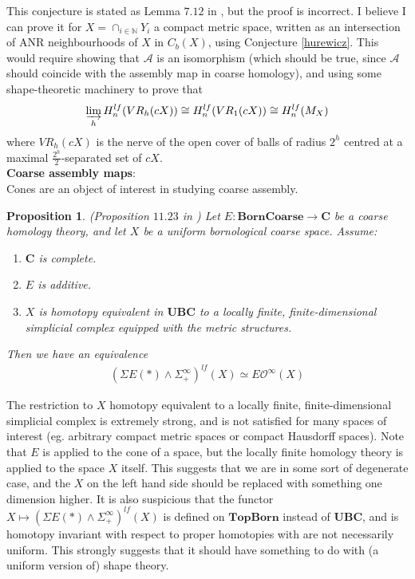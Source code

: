 \documentclass[a4paper,11pt]{article}
\theoremstyle{definition}
\theoremstyle{plain}
\newtheorem{prop}[definition]{Proposition}
\theoremstyle{remark}
\begin{document}
{This conjecture is stated as Lemma $7.12$ in \cite{bunke2020lecture}, but the proof is incorrect. I believe I can prove it for $X = \cap_{i\in \mathbb{N}} Y_{i}$ a compact metric space, written as an intersection of ANR neighbourhoods of $X$ in $C_{b}(X)$, using Conjecture \ref{hurewicz}. This would require showing that $\mathcal{A}$ is an isomorphism (which should be true, since $\mathcal{A}$ should coincide with the assembly map in coarse homology), and using some shape-theoretic machinery to prove that 
\begin{align*}
\varinjlim_{h} H^{lf}_{n}(VR_{h}(cX))\cong  H^{lf}_{n}(VR_{1}(cX)) \cong H^{lf}_{n}(M_{X})
\end{align*}
where $VR_{h}(cX)$ is the nerve of the open cover of balls of radius $2^{h}$ centred at a maximal $\frac{2^h}{2}$-separated set of $cX$. \\

 \textbf{Coarse assembly maps}:\\

Cones are an object of interest in studying coarse assembly. 
 
 \begin{prop}  \label{assemblymap} (Proposition $11.23$ in \cite{bunke2020coarse}) Let $E:\mathbf{BornCoarse}\rightarrow \mathbf{C}$ be a coarse homology theory, and let $X$ be a uniform bornological coarse space. Assume:
 \begin{enumerate}
 \item $\mathbf{C}$ is complete. 
 \item $E$ is additive. 
 \item $X$ is homotopy equivalent in $\mathbf{UBC}$ to a locally finite, finite-dimensional simplicial complex equipped with the metric structures.
 \end{enumerate}
 Then we have an equivalence
 \begin{align*}
 (\Sigma E(\ast) \wedge \Sigma_{+}^{\infty})^{lf}(X)\simeq E\mathcal{O}^{\infty}(X)
 \end{align*}
 \end{prop}
 
 The restriction to $X$ homotopy equivalent to a locally finite, finite-dimensional simplicial complex is extremely strong, and is not satisfied for many spaces of interest (eg. arbitrary compact metric spaces or compact Hausdorff spaces). Note that $E$ is applied to the cone of a space, but the locally finite homology theory is applied to the space $X$ itself. This suggests that we are in some sort of degenerate case, and the $X$ on the left hand side should be replaced with something one dimension higher. It is also suspicious that the functor $X\mapsto (\Sigma E(\ast) \wedge \Sigma_{+}^{\infty})^{lf}(X)$ is defined on $\mathbf{TopBorn}$ instead of $\mathbf{UBC}$, and is homotopy invariant with respect to proper homotopies with are not necessarily uniform. This strongly suggests that it should have something to do with (a uniform version of) shape theory.


}
\end{document}

